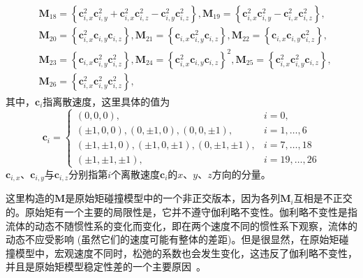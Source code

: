 \begin{align}
\begin{split}
    & \boldsymbol{M}_{18}=\left\{\boldsymbol{c}_{i, x}^2 \boldsymbol{c}_{i, y}^2+\boldsymbol{c}_{i, x}^2 \boldsymbol{c}_{i, z}^2-\boldsymbol{c}_{i, y}^2 \boldsymbol{c}_{i, z}^2\right\}, \boldsymbol{M}_{19}=\left\{\boldsymbol{c}_{i, x}^2 \boldsymbol{c}_{i, y}^2-\boldsymbol{c}_{i, x}^2 \boldsymbol{c}_{i, z}^2\right\}, \\
    & \boldsymbol{M}_{20}=\left\{\boldsymbol{c}_{i, x}^2 \boldsymbol{c}_{i, y} \boldsymbol{c}_{i, z}\right\}, \boldsymbol{M}_{21}=\left\{\boldsymbol{c}_{i, x} \boldsymbol{c}_{i, y}^2 \boldsymbol{c}_{i, z}\right\}, \boldsymbol{M}_{22}=\left\{\boldsymbol{c}_{i, x} \boldsymbol{c}_{i, y} \boldsymbol{c}_{i, z}^2\right\}, \\
    & \boldsymbol{M}_{23}=\left\{\boldsymbol{c}_{i, x} \boldsymbol{c}_{i, y}^2 \boldsymbol{c}_{i, z}^2\right\}, \boldsymbol{M}_{24}=\left\{\boldsymbol{c}_{i, x}^2 \boldsymbol{c}_{i, y} \boldsymbol{c}_{i, z}\right\}^2, \boldsymbol{M}_{25}=\left\{\boldsymbol{c}_{i, x}^2 \boldsymbol{c}_{i, y}^2 \boldsymbol{c}_{i, z}\right\}, \\
    & \boldsymbol{M}_{26}=\left\{\boldsymbol{c}_{i, x}^2 \boldsymbol{c}_{i, y}^2 \boldsymbol{c}_{i, z}^2\right\},
\end{split}
\label{eq:rm_mrt}
\end{align}
其中，$\boldsymbol{c}_{i}$指离散速度，这里具体的值为
\begin{equation}
    \boldsymbol{c}_i= \begin{cases}(0,0,0), & i=0, \\
        ( \pm 1,0,0),(0, \pm 1,0),(0,0, \pm 1), & i=1, \ldots, 6 \\
        ( \pm 1, \pm 1,0),( \pm 1,0, \pm 1),(0, \pm 1, \pm 1), & i=7, \ldots, 18 \\
        ( \pm 1, \pm 1, \pm 1), & i=19, \ldots, 26\end{cases}
\end{equation}
$\boldsymbol{c}_{i, x}$、$\boldsymbol{c}_{i, y}$与$\boldsymbol{c}_{i, z}$分别指第$i$个离散速度$\boldsymbol{c}_{i}$的$x$、$y$、$z$方向的分量。

这里构造的$\mathbf{M}$是原始矩碰撞模型中的一个非正交版本，因为各列$\mathbf{M}_{i}$互相是不正交的。原始矩有一个主要的局限性是，它并不遵守伽利略不变性。伽利略不变性是指流体的动态不随惯性系的变化而变化，即在两个速度不同的惯性系下观察，流体的动态不应受影响 (虽然它们的速度可能有整体的差距)。但是很显然，在原始矩碰撞模型中，宏观速度不同时，松弛的系数也会发生变化，这违反了伽利略不变性，并且是原始矩模型稳定性差的一个主要原因~\citep{PhysRevE.95.013310}。

